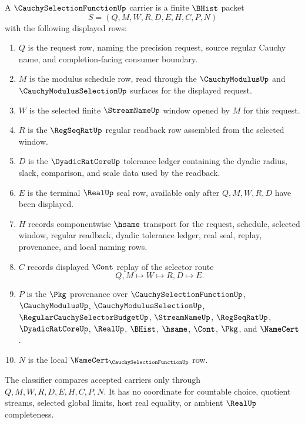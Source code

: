 \begin{definition}
\label{def:cauchy-selection-function-carrier}
A $\CauchySelectionFunctionUp$ carrier is a finite $\BHist$ packet
$$
S=(Q,M,W,R,D,E,H,C,P,N)
$$
with the following displayed rows:
\begin{enumerate}
\item $Q$ is the request row, naming the precision request, source regular Cauchy name, and completion-facing consumer boundary.
\item $M$ is the modulus schedule row, read through the $\CauchyModulusUp$ and $\CauchyModulusSelectionUp$ surfaces for the displayed request.
\item $W$ is the selected finite $\StreamNameUp$ window opened by $M$ for this request.
\item $R$ is the $\RegSeqRatUp$ regular readback row assembled from the selected window.
\item $D$ is the $\DyadicRatCoreUp$ tolerance ledger containing the dyadic radius, slack, comparison, and scale data used by the readback.
\item $E$ is the terminal $\RealUp$ seal row, available only after $Q,M,W,R,D$ have been displayed.
\item $H$ records componentwise $\hsame$ transport for the request, schedule, selected window, regular readback, dyadic tolerance ledger, real seal, replay, provenance, and local naming rows.
\item $C$ records displayed $\Cont$ replay of the selector route
$$
Q,M \longmapsto W \longmapsto R,D \longmapsto E .
$$
\item $P$ is the $\Pkg$ provenance over $\CauchySelectionFunctionUp$, $\CauchyModulusUp$, $\CauchyModulusSelectionUp$, $\RegularCauchySelectorBudgetUp$, $\StreamNameUp$, $\RegSeqRatUp$, $\DyadicRatCoreUp$, $\RealUp$, $\BHist$, $\hsame$, $\Cont$, $\Pkg$, and $\NameCert$.
\item $N$ is the local $\NameCert_{\CauchySelectionFunctionUp}$ row.
\end{enumerate}
The classifier compares accepted carriers only through $Q,M,W,R,D,E,H,C,P,N$. It has no coordinate for countable choice, quotient streams, selected global limits, host real equality, or ambient $\RealUp$ completeness.
\end{definition}

